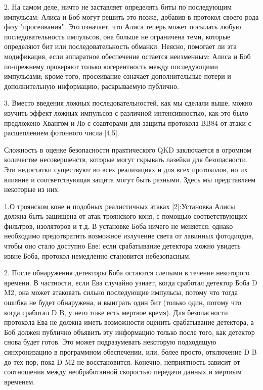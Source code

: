2. На самом деле, ничто не заставляет определять биты по последующим импульсам: Алиса и Боб могут решить это позже, добавив в протокол своего рода фазу "просеивания". Это означает, что Алиса теперь может посылать любую последовательность импульсов, она больше не ограничена теми, которые определяют бит или последовательность обманки. Неясно, помогает ли эта модификация, если аппаратное обеспечение остается неизменным: Алиса и Боб по-прежнему проверяют только когерентность между последующими импульсами; кроме того, просеивание означает дополнительные потери и дополнительную информацию, раскрываемую публично.

3. Вместо введения ложных последовательностей, как мы сделали выше, можно изучить эффект ложных импульсов с различной интенсивностью, как это было предложено Хвангом и Ло с соавторами для защиты протокола BB84 от атаки с расщеплением фотонного числа [4,5].

Сложность в оценке безопасности практического QKD заключается в огромном количестве несовершенств, которые могут скрывать лазейки для безопасности. Эти недостатки существуют во всех реализациях и для всех протоколов, но их влияние и соответствующая защита могут быть разными. Здесь мы представляем некоторые из них.

1.О троянском коне и подобных реалистичных атаках [2]:Установка Алисы должна быть защищена от атак троянского коня, с помощью соответствующих фильтров, изоляторов и т.д. В установке Боба ничего не меняется; однако необходимо предотвратить возможное излучение света от лавинных фотодиодов, чтобы оно стало доступно Еве: если срабатывание детектора можно увидеть извне Боба, протокол немедленно становится небезопасным.

2. После обнаружения детекторы Боба остаются слепыми в течение некоторого времени. В частности, если Ева случайно узнает, когда сработал детектор Боба D M2, она может атаковать сильно последующие импульсы, потому что тогда ошибка не будет обнаружена, и выиграть один бит (только один, потому что когда сработал D B, у него тоже есть мертвое время). Для безопасности протокола Ева не должна иметь возможности оценить срабатывание детектора, а Боб должен публично объявить эту информацию только после того, как детектор снова будет готов. Это может подразумевать некоторую подходящую синхронизацию в программном обеспечении, или, более просто, отключение D B до тех пор, пока D M2 не восстановится. Конечно, неприятность зависит от соотношения между необработанной скоростью передачи данных и мертвым временем.


